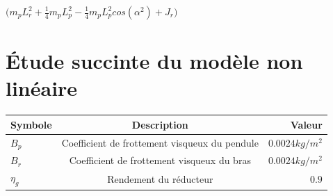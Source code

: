 \documentclass[12pt, a4paper, openany]{report}
\begin{document}

  $\bigg(m_{p}L_{r}^{2} + \frac{1}{4}m_{p}L_{p}^{2} - \frac{1}{4}m_{p}L_{p}^{2}cos(\alpha^{2}) + J_{r} \bigg)$

   


\section{Étude succinte du modèle non linéaire  }

                                                 




\begin{center}
\begin{tabular}{|l|c|r|}
\hline \rowcolor{lightgray} Symbole & Description &  Valeur  \\
\hline  $B_{p}$  &  Coefficient de frottement visqueux du pendule  & $0.0024 kg/m^{2}$   \\
\hline  $B_{r}$ & Coefficient de frottement visqueux du bras & $0.0024 kg/m^{2}$ \\
\hline  $\eta_{g}$  &  Rendement du réducteur  & $0.9$  \\

\hline 
\end{tabular}
\end{center}






	
\end{document}
